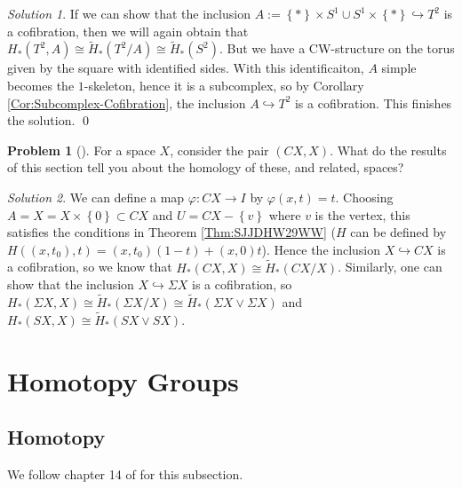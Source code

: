\documentclass[reqno]{amsart}
\theoremstyle{definition}
\newtheorem{problem}[theorem]{Problem}
\theoremstyle{remark}
\newtheorem*{solution}{Solution}
\begin{document}
\begin{solution}
    If we can show that the inclusion
    $A:= \left\{ * \right\} \times S^{1} \cup 
    S^{1} \times \left\{ * \right\} \hookrightarrow
    T^2$ is a cofibration, then
    we will again obtain that
    $H_* (T^2, A) \cong
    \tilde{H}_* \left( T^2 / A \right) \cong
    \tilde{H}_* \left( S^2 \right) $.
    But we have a CW-structure on the
    torus given by the square with identified sides.
    With this identificaiton, $A$ simple becomes
    the $1$-skeleton, hence it is a subcomplex, so
    by Corollary \ref{Cor:Subcomplex-Cofibration}, 
    the inclusion $A \hookrightarrow T^2$ is a cofibration.
    This finishes the solution. \qed
\end{solution}

\begin{problem}[]
    For a space $X$, consider the pair
    $\left( CX, X \right) $. What do the results of this
    section tell you about the homology of these, and related,
    spaces?
\end{problem}

\begin{solution}
    We can define a map
    $\varphi \colon CX \to I$ by
    $\varphi (x,t) = t$. Choosing
    $A = X = X \times \left\{ 0 \right\} \subset 
    CX$ and
    $U = CX - \left\{ v \right\} $ where
    $v$ is the vertex, this satisfies the
    conditions in Theorem \ref{Thm:SJJDHW29WW} 
    ($H$ can be defined by
    $H((x,t_0),t) = \left( x,t_0 \right) (1-t)
    + (x,0) t$).
    Hence the inclusion
    $X \hookrightarrow CX$ is a cofibration, so we
    know that
    $H_* \left( CX, X \right) 
    \cong \tilde{H}_* \left( CX / X \right) $.
    Similarly, one can
    show that the inclusion
    $X \hookrightarrow \Sigma X$ is a cofibration, so
    $H_* \left( \Sigma X , X \right) 
    \cong \tilde{H}_* \left( \Sigma X / X \right) 
    \cong \tilde{H}_* \left( 
    \Sigma X \vee \Sigma X \right) $ and
    $H_*\left( SX, X \right) 
    \cong \tilde{H}_* \left( SX \vee SX \right) $.
\end{solution}








\newpage

\section{Homotopy Groups}

\subsection{Homotopy}
We follow chapter 14 of \cite{Bredon} for this subsection.\\
\end{document}
